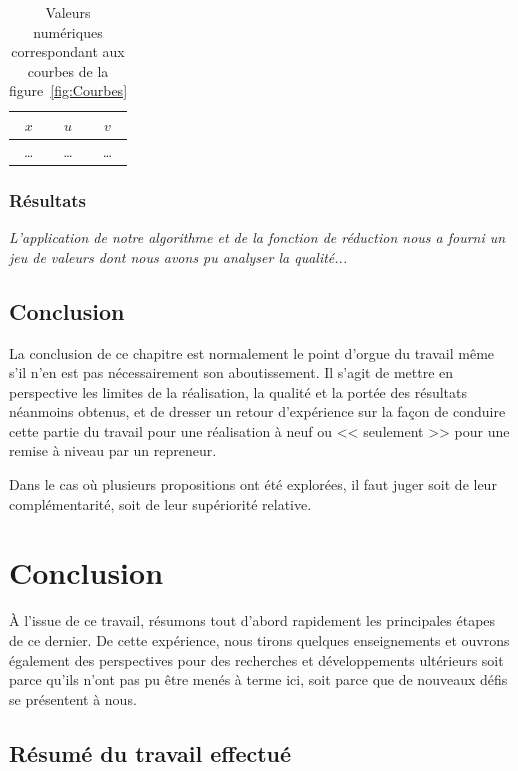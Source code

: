 \documentclass[11pt, french]{report-rd-info}
\begin{document}
\begin{table}
	\centering
	\begin{tabular}{|c||c|c|}
		\hline
		$x$ & $u$ & $v$\\
		\hline
		\hline
		\ldots & \ldots & \ldots\\
		\hline
	\end{tabular}
	\caption{Valeurs numériques correspondant aux courbes de la figure~\ref{fig:Courbes}}
	\label{tab:Courbes}
\end{table}

\subsection{Résultats}

\emph{L'application de notre algorithme et de la fonction de réduction nous a fourni un jeu de valeurs dont nous avons pu analyser la qualité...}

\section{Conclusion}

La conclusion de ce chapitre est normalement le point d'orgue du travail même s'il n'en est pas nécessairement son aboutissement. Il s'agit de mettre en perspective les limites de la réalisation, la qualité et la portée des résultats néanmoins obtenus, et de dresser un retour d'expérience sur la façon de conduire cette partie du travail pour une réalisation à neuf ou << seulement >> pour une remise à niveau par un repreneur.

Dans le cas où plusieurs propositions ont été explorées, il faut juger soit de leur complémentarité, soit de leur supériorité relative.


\chapter{Conclusion}

À l'issue de ce travail, résumons tout d'abord rapidement les principales étapes de ce dernier. De cette expérience, nous tirons quelques enseignements et ouvrons également des perspectives pour des recherches et développements ultérieurs soit parce qu'ils n'ont pas pu être menés à terme ici, soit parce que de nouveaux défis se présentent à nous.

\section{Résumé du travail effectué}
\end{document}
